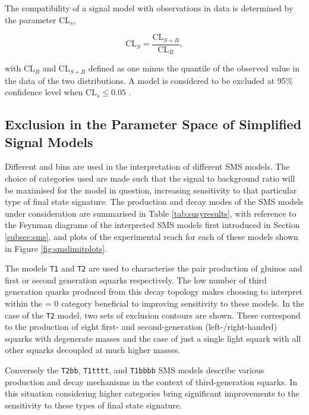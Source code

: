 The compatibility of a signal model with observations in data is determined by the parameter CL$_{s}$,

\begin{equation}
\text{CL$_{S}$} = \frac{\text{CL$_{S+B}$}}{\text{CL$_{B}$}},
\end{equation}

with CL$_{B}$ and CL$_{S+B}$ defined as one minus the quantile of the observed value in the data of the two distributions. A model is considered to be excluded at 95\% confidence level when CL$_{s} \leq 0.05$ \cite{2011EPJClimits}.

\subsection{Exclusion in the Parameter Space of Simplified Signal Models}

Different \njet and \nbreco bins are used in the interpretation of different \ac{SMS} models. The choice of categories used are made such that the signal to background ratio will be maximised for the model in question, increasing sensitivity to that particular type of final state signature. The production and decay modes of the \ac{SMS} models under consideration are summarised in Table \ref{tab:susyresults}, with reference to the Feynman diagrams of the interpreted \ac{SMS}
models first introduced in Section \ref{subsec:sms}, and plots of the experimental reach for each of these models shown in Figure \ref{fig:smslimitplots}.

The models \texttt{T1} and \texttt{T2} are used to characterise the pair production of gluinos and first or second generation squarks respectively. The low number of third generation quarks produced from this decay topology makes choosing to interpret within the \nbreco = 0 category beneficial to improving sensitivity to these models. In the case of the \texttt{T2} model, two sets of exclusion contours are shown. These correspond to the production of eight first- and second-generation (left-/right-handed) squarks with degenerate masses and the case of just a single light squark with all other squarks decoupled at much higher masses.

Conversely the \texttt{T2bb}, \texttt{T1tttt}, and \texttt{T1bbbb} \ac{SMS} models describe various production and decay mechanisms in the context of third-generation squarks. In this situation considering higher \nbreco categories bring significant improvements to the sensitivity to these types of final state signature. 

